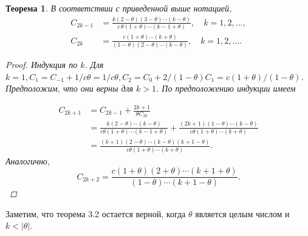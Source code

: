 \documentclass[14pt, a4paper]{extarticle}
\newtheorem{theorem}{Теорема}[section] %
\theoremstyle{definition}
\theoremstyle{remark}
\begin{document}
\begin{theorem}
В соответствии с приведенной выше нотацией,
\begin{align*}
C_{2k-1} &= \frac{k (2 - \theta) (3 - \theta) \cdots (k - \theta)}{c \, \theta (1 + \theta) \cdots (k - 1 + \theta)}, \quad k = 1, 2, \dots, \\
C_{2k} &= \frac{c (1 + \theta) \cdots (k + \theta)}{(1 - \theta) (2 - \theta) \cdots (k - \theta)}, \quad k = 1, 2, \dots .
\end{align*}


\begin{proof}
Индукция по $k$. Для $k=1, C_{1}=C_{-1}+1 / c \theta=1 / c \theta, C_{2}=C_{0}+2 /(1-\theta) C_{1}= c(1+\theta) /(1-\theta)$. Предположим, что они верны для $k>1$. По предположению индукции имеем

\begin{align*}
C_{2 k+1} & =C_{2 k-1}+\frac{2 k+1}{\theta C_{2 k}} \\
& =\frac{k(2-\theta) \cdots(k-\theta)}{c \theta(1+\theta) \cdots(k-1+\theta)}+\frac{(2 k+1)(1-\theta) \cdots(k-\theta)}{c \theta(1+\theta) \cdots(k+\theta)} \\
& =\frac{(k+1)(2-\theta) \cdots(k-\theta)(k+1-\theta)}{c \theta(1+\theta) \cdots(k+\theta)} .
\end{align*}
Аналогично,
\begin{equation*}
C_{2 k+2}=\frac{c(1+\theta)(2+\theta) \cdots(k+1+\theta)}{(1-\theta) \cdots(k+1-\theta)} .
\end{equation*}

\end{proof}

\end{theorem}
Заметим, что теорема 3.2 остается верной, когда $\theta$ является целым числом и $k<|\theta|$.
\end{document}
